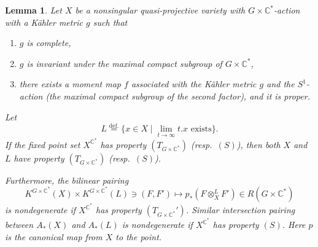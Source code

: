 \documentclass[12pt]{amsart}
\def\Bbb{\mathbb}
\renewcommand{\labelenumi}{(\theenumi)}%
\newcommand{\rom}{\textup}
\newenvironment{aenume}{%
  \begin{enumerate}%
  \renewcommand{\theenumi}{\alph{enumi}}%
  \renewcommand{\labelenumi}{(\theenumi)}%
  }{\end{enumerate}}
\newtheorem{Lemma}[equation]{Lemma}
\theoremstyle{definition}
\theoremstyle{remark}
\numberwithin{equation}{subsection}
\newcommand{\defeq}{\overset{\operatorname{\scriptstyle def.}}{=}}
\newcommand{\C}{{\Bbb C}}
\begin{document}
\begin{Lemma}\label{lem:BB}
Let $X$ be a nonsingular quasi-projective variety with
$G\times\C^*$-action with a K\"ahler metric $g$ such that
\begin{aenume}
\item $g$ is complete,
\item $g$ is invariant under the maximal compact subgroup of
$G\times\C^*$,
\item there exists a moment map $f$ associated with the K\"ahler
metric $g$ and the $S^1$-action \rom(the maximal compact subgroup of
the second factor\rom), and it is proper.
\end{aenume}
Let
\begin{equation*}
   L \defeq \{ x\in X \mid
   \text{$\displaystyle\lim_{t\to\infty} t.x$ exists} \}.
\end{equation*}
If the fixed point set $X^{\C^*}$ has property
$(T_{G\times\C^*})$ \rom(resp.\ $(S)$\rom),
then both $X$ and $L$ have property
$(T_{G\times\C^*})$ \rom(resp.\ $(S)$\rom).

Furthermore, the bilinear pairing
\begin{equation}\label{eq:pairing}
   K^{G\times\C^*}(X) \times K^{G\times\C^*}(L) \ni (F, F') 
   \longmapsto p_*(F\otimes^L_X F')\in R(G\times\C^*)
\end{equation}
is nondegenerate if $X^{\C^*}$ has property $(T_{G\times\C^*}')$.
%
Similar intersection pairing between $A_*(X)$ and $A_*(L)$ is
nondegenerate if $X^{\C^*}$ has property $(S)$.
Here $p$ is the canonical map from $X$ to the point.
\end{Lemma}
\end{document}
